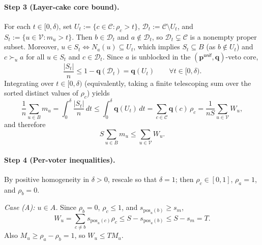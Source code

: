\documentclass[11pt]{article}
\newcommand{\pos}{\mathrm{pos}}
\newcommand{\unif}{\mathsf{unif}}
\begin{document}
\paragraph{Step 3 (Layer-cake core bound).}
For each $t \in [0, \delta)$, set $U_t := \{c \in \mathcal{C} : \rho_c > t\}$, $\mathcal{D}_t := \mathcal{C} \setminus U_t$, and $S_t := \{u \in \mathcal{V} : m_u > t\}$. Then $b \in \mathcal{D}_t$ and $a \notin \mathcal{D}_t$, so $\mathcal{D}_t \subsetneq \mathcal{C}$ is a nonempty proper subset. Moreover, $u \in S_t \iff N_a(u) \subseteq U_t$, which implies $S_t \subseteq B$ (as $b \notin U_t$) and $c \succ_u a$ for all $u \in S_t$ and $c \in \mathcal{D}_t$. Since $a$ is unblocked in the $(\mathbf{p}^{\unif}, \mathbf{q})$-veto core,
\[
\frac{|S_t|}{n} \le 1 - \mathbf{q}(\mathcal{D}_t) = \mathbf{q}(U_t) \qquad \forall t \in [0, \delta).
\]
Integrating over $t \in [0, \delta)$ (equivalently, taking a finite telescoping sum over the sorted distinct values of $\rho_c$) yields
\[
\frac{1}{n}\sum_{u \in B} m_u = \int_0^\delta \frac{|S_t|}{n}\,dt \le \int_0^\delta \mathbf{q}(U_t)\,dt = \sum_{c \in \mathcal{C}} \mathbf{q}(c)\,\rho_c = \frac{1}{nS}\sum_{u \in \mathcal{V}} W_u,
\]
and therefore
\begin{equation}\label{eq:step3}
S \sum_{u \in B} m_u \le \sum_{u \in \mathcal{V}} W_u.
\end{equation}

\paragraph{Step 4 (Per-voter inequalities).}
By positive homogeneity in $\delta > 0$, rescale so that $\delta = 1$; then $\rho_c \in [0, 1]$, $\rho_a = 1$, and $\rho_b = 0$.

\emph{Case (A): $u \in A$.} Since $\rho_b = 0$, $\rho_c \le 1$, and $s_{\pos_u(b)} \ge s_m$,
\[
W_u = \sum_{c \neq b} s_{\pos_u(c)} \rho_c \le S - s_{\pos_u(b)} \le S - s_m = T.
\]
Also $M_u \ge \rho_a - \rho_b = 1$, so $W_u \le T M_u$.
\end{document}
